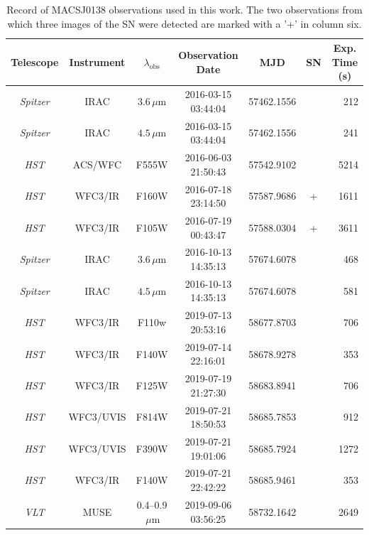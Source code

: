 \documentclass[12pt,dvipsnames]{article}
\begin{document}
\begin{table}[h]
\centering
\begin{tabular}{ccccccr}
    \multicolumn{1}{c}{Telescope} & \multicolumn{1}{c}{Instrument} & \multicolumn{1}{c}{$\lambda_\mathrm{obs}$} & \multicolumn{1}{c}{Observation Date} & \multicolumn{1}{c}{MJD} & \multicolumn{1}{c}{SN} & \multicolumn{1}{c}{Exp. Time (s)}\\

\midrule
\textit{Spitzer} & IRAC      & $3.6\,\mu\mathrm{m}$      & 2016-03-15 03:44:04 & 57462.1556 &   & 212 \\ %
\textit{Spitzer} & IRAC      & $4.5\,\mu\mathrm{m}$      & 2016-03-15 03:44:04 & 57462.1556 &   & 241 \\
\textit{HST}     & ACS/WFC   & F555W                     & 2016-06-03 21:50:43 & 57542.9102 &   & 5214 \\
\textit{HST}     & WFC3/IR   & F160W                     & 2016-07-18 23:14:50 & 57587.9686 & + & 1611 \\
\textit{HST}     & WFC3/IR   & F105W                     & 2016-07-19 00:43:47 & 57588.0304 & + & 3611 \\ 
\textit{Spitzer} & IRAC      & $3.6\,\mu\mathrm{m}$      & 2016-10-13 14:35:13 & 57674.6078 &   & 468 \\ %
\textit{Spitzer} & IRAC      & $4.5\,\mu\mathrm{m}$      & 2016-10-13 14:35:13 & 57674.6078 &   & 581 \\
\midrule
\textit{HST}     & WFC3/IR   & F110w                     & 2019-07-13 20:53:16 & 58677.8703 &   & 706 \\ 
\textit{HST}     & WFC3/IR   & F140W                     & 2019-07-14 22:16:01 & 58678.9278 &   & 353 \\ 
\textit{HST}     & WFC3/IR   & F125W                     & 2019-07-19 21:27:30 & 58683.8941 &   & 706 \\ 
\textit{HST}     & WFC3/UVIS & F814W                     & 2019-07-21 18:50:53 & 58685.7853 &   & 912 \\ 
\textit{HST}     & WFC3/UVIS & F390W                     & 2019-07-21 19:01:06 & 58685.7924 &   & 1272 \\ 
\textit{HST}     & WFC3/IR   & F140W                     & 2019-07-21 22:42:22 & 58685.9461 &   & 353 \\ 
\textit{VLT}     & MUSE      & 0.4--0.9$\,\mu\mathrm{m}$ & 2019-09-06 03:56:25 & 58732.1642 &   & 2649  \\
\end{tabular}
\caption{Record of MACSJ0138 observations used in this work.  
The two observations from which three images of the SN were detected are marked with a '+' in column six.
\label{tab:observations}
}
\end{table}
\end{document}
